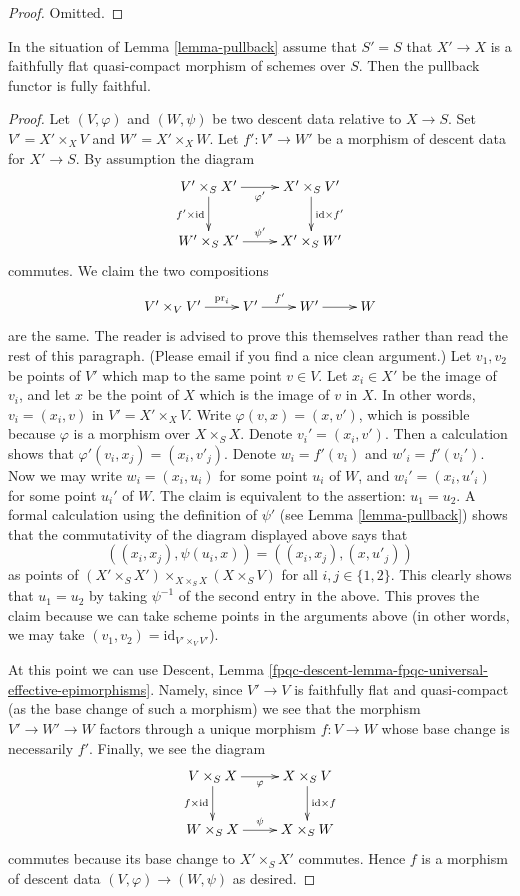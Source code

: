 \begin{proof}
Omitted.
\end{proof}

\begin{lemma}
\label{lemma-fully-faithful}
In the situation of Lemma \ref{lemma-pullback}
assume that $S' = S$ that $X' \to X$ is a faithfully flat quasi-compact
morphism of schemes over $S$. Then the pullback
functor is fully faithful.
\end{lemma}

\begin{proof}
Let $(V, \varphi)$ and $(W, \psi)$ be two descent data relative
to $X \to S$. Set $V' = X' \times_X V$ and $W' = X' \times_X W$.
Let $f' : V' \to W'$ be a morphism of descent data for $X' \to S$.
By assumption the diagram
$$
\xymatrix{
V' \times_S X' \ar[r]_{\varphi'} \ar[d]_{f' \times \text{id}} &
X' \times_S V' \ar[d]^{\text{id} \times f'} \\
W' \times_S X' \ar[r]^{\psi'} & X' \times_S W'
}
$$
commutes. We claim the two compositions
$$
\xymatrix{
V' \times_V V' \ar[r]^-{\text{pr}_i} &
V' \ar[r]^{f'} &
W' \ar[r] &
W
}
$$
are the same. The reader is advised to prove this themselves rather
than read the rest of this paragraph. (Please email if you find a 
nice clean argument.) Let $v_1, v_2$ be points of $V'$ which map to the same
point $v \in V$. Let $x_i \in X'$ be the image of $v_i$, and let
$x$ be the point of $X$ which is the image of $v$ in $X$. In other words,
$v_i = (x_i, v)$ in $V' = X' \times_X V$. Write
$\varphi(v, x) = (x, v')$, which is possible because $\varphi$ is
a morphism over $X \times_S X$. Denote
$v_i' = (x_i, v')$. Then a calculation shows that
$\varphi'(v_i, x_j) = (x_i, v'_j)$. Denote
$w_i = f'(v_i)$ and $w'_i = f'(v_i')$.
Now we may write $w_i = (x_i, u_i)$ for some point $u_i$ of $W$,
and $w_i' = (x_i, u'_i)$ for some point $u_i'$ of $W$.
The claim is equivalent to the assertion: $u_1 = u_2$.
A formal calculation using the definition of $\psi'$
(see Lemma \ref{lemma-pullback}) shows
that the commutativity of the diagram displayed above says that
$$
((x_i, x_j), \psi(u_i, x)) = ((x_i, x_j), (x, u'_j))
$$
as points of $(X' \times_S X') \times_{X \times_S X} (X \times_S V)$
for all $i, j \in \{1, 2\}$. This clearly shows that
$u_1 = u_2$ by taking $\psi^{-1}$ of the second entry
in the above. This proves the claim because we can take
scheme points in the arguments above (in other words, we may
take $(v_1, v_2) = \text{id}_{V' \times_V V'}$).

\medskip\noindent
At this point we can use Descent,
Lemma \ref{fpqc-descent-lemma-fpqc-universal-effective-epimorphisms}.
Namely, since $V' \to V$ is faithfully flat and quasi-compact (as
the base change of such a morphism) we see that the morphism
$V' \to W' \to W$ factors through a unique morphism $f : V \to W$
whose base change is necessarily $f'$.
Finally, we see the diagram
$$
\xymatrix{
V \times_S X \ar[r]_{\varphi} \ar[d]_{f \times \text{id}} &
X \times_S V \ar[d]^{\text{id} \times f} \\
W \times_S X \ar[r]^{\psi} & X \times_S W
}
$$
commutes because its base change to $X' \times_S X'$ commutes.
Hence $f$ is a morphism of descent data $(V, \varphi) \to (W, \psi)$
as desired.
\end{proof}

